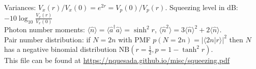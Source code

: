 \documentclass[12pt,letterpaper]{article}
\newcommand{\braket}[1]{\langle #1 \rangle}
\begin{document}
\begin{table}[!h]
{Variances: $V_x(r)/V_x(0) = e^{2r} = V_p(0)/V_p(r)$.  Squeezing level in dB: $-10 \log_{10} \frac{V_x(r)}{V_x(0)}$ \\
Photon number moments: $\langle \hat n \rangle  = \langle \hat a^\dagger \hat a \rangle  = \sinh^2 r$, $\langle \hat n^2 \rangle = 3 \langle \hat n \rangle ^2 + 2 \langle \hat n \rangle$. \\
Pair number distribution: if $N=2n$ with PMF $p(N=2n) = |\braket{2n|r}|^2$ then $N$ has a negative binomial distribution $\text{NB}\left(r=\tfrac{1}{2},p = 1-\tanh^2 r\right)$. \\}
{\tiny This file can be found at \url{https://nquesada.github.io/misc/squeezing.pdf} }


\end{table}
\end{document}
